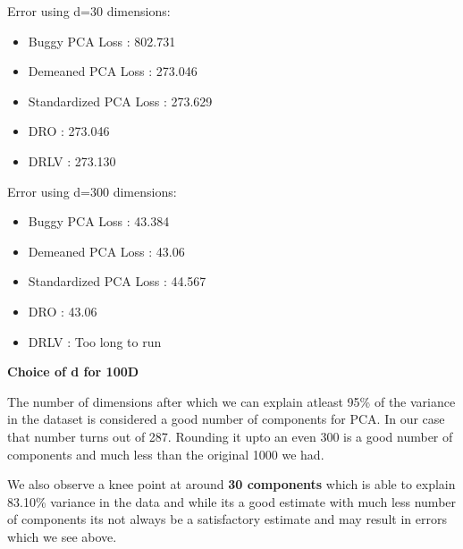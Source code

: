 \begin{soln}
    Error using d=30 dimensions:
    \begin{itemize}
        \item Buggy PCA Loss : 802.731
        \item Demeaned PCA Loss : 273.046
        \item Standardized PCA Loss : 273.629
        \item DRO : 273.046
        \item DRLV : 273.130
    \end{itemize}

    Error using d=300 dimensions:
    \begin{itemize}
        \item Buggy PCA Loss : 43.384
        \item Demeaned PCA Loss : 43.06
        \item Standardized PCA Loss : 44.567
        \item DRO : 43.06
        \item DRLV : Too long to run
    \end{itemize}
\end{soln}

\textbf{Choice of d for 100D}
    
\begin{soln}
    The number of dimensions after which we can explain atleast 95\% of the variance in the dataset is considered a good number of components for PCA. In our case that number turns out of 287. Rounding it upto an even 300 is a good number of components and much less than the original 1000 we had.

    We also observe a knee point at around \textbf{30 components} which is able to explain 83.10\% variance in the data and while its a good estimate with much less number of components its not always be a satisfactory estimate and may result in errors which we see above.\\
\end{soln}



